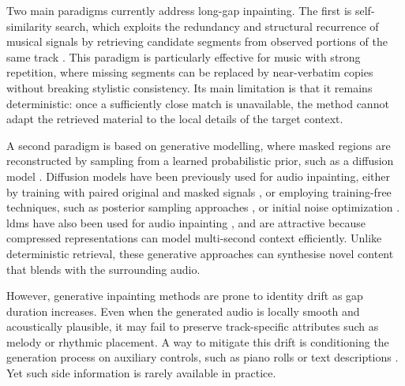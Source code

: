 \documentclass{article}
\begin{document}
Two main paradigms currently address long-gap inpainting.
The first is self-similarity search, which exploits the redundancy and structural recurrence of musical signals \cite{foote1999visualizing} by retrieving candidate segments from observed portions of the same track \cite{martin2011exemplar, perraudin_inpainting_2018}.
This paradigm is particularly effective for music with strong repetition, where missing segments can be replaced by near-verbatim copies without breaking stylistic consistency.
Its main limitation is that it remains deterministic: once a sufficiently close match is unavailable, the method cannot adapt the retrieved material to the local details of the target context.

A second paradigm is based on generative modelling, where masked regions are reconstructed by sampling from a learned probabilistic prior, such as a diffusion model \cite{sohl-dickstein_deep_2015, ho_denoising_2020}.
Diffusion models have been previously used for audio inpainting, either by training with paired original and masked signals \cite{kong2025a2sb}, or employing training-free techniques, such as posterior sampling approaches \cite{moliner2023solving, moliner_diffusion-based_2024}, 
or initial noise optimization \cite{novack_ditto_2024, ben2024d}.
\acp{ldm} have also been used for audio inpainting \cite{liu2023audioldm, wang2023audit}, and are attractive because compressed representations can model multi-second context efficiently.
Unlike deterministic retrieval, these generative approaches can synthesise novel content that blends with the surrounding audio.

However, generative inpainting methods are prone to identity drift as gap duration increases.
Even when the generated audio is locally smooth and acoustically plausible, it may fail to preserve track-specific attributes such as melody or rhythmic placement.
A way to mitigate this drift is conditioning the generation process on auxiliary controls, such as piano rolls \cite{liu2023maid} or text descriptions \cite{wang2023audit, liu2023audioldm, novack_ditto_2024}.
Yet such side information is rarely available in practice.
\end{document}

